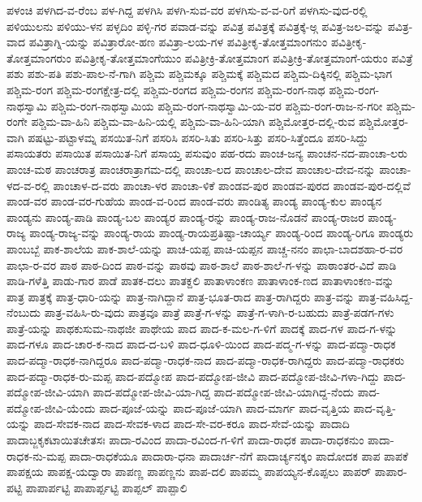 ಪಳಂಚಿ
ಪಳಗಿದ-ವ-ರೆಂಬ
ಪಳ-ಗಿದ್ದ
ಪಳಗಿಸಿ
ಪಳಗಿ-ಸುವ-ವರ
ಪಳಗಿಸು-ವ-ವ-ರಿಗೆ
ಪಳಗಿಸು-ವುದ-ರಲ್ಲಿ
ಪಳಿಯುಲನು
ಪಳಿಯು-ಳನ
ಪಳ್ಳದಿಂ
ಪಳ್ಳಿ-ಗರ
ಪವಾಡ-ವನ್ನು
ಪವಿತ್ರ
ಪವಿತ್ರಕ್ಕೆ
ಪವಿತ್ರಕ್ಕೆ-ಅ್ಗ
ಪವಿತ್ರ-ಜಲ-ವನ್ನು
ಪವಿತ್ರ-ವಾದ
ಪವಿತ್ರಾಗ್ನಿ-ಯನ್ನು
ಪವಿತ್ರಾರೋ-ಹಣ
ಪವಿತ್ರಾ-ಲಯ-ಗಳ
ಪವಿತ್ರೀಕೃ-ತೋತ್ತಮಾಂಗನುಂ
ಪವಿತ್ರೀಕೃ-ತೋತ್ತಮಾಂಗರುಂ
ಪವಿತ್ರೀಕೃ-ತೋತ್ತಮಾಂಗೆಯುಂ
ಪವಿತ್ರೀಕ್ರಿ-ತೋತ್ತಮಾಂಗ
ಪವಿತ್ರೀಕ್ರಿ-ತೋತ್ತಮಾಂಗೆ-ಯರುಂ
ಪವಿತ್ರೆ
ಪಶು
ಪಶು-ಪತಿ
ಪಶು-ಪಾಲ-ನೆ-ಗಾಗಿ
ಪಶ್ಚಿಮ
ಪಶ್ಚಿಮಕ್ಕೂ
ಪಶ್ಚಿಮಕ್ಕೆ
ಪಶ್ಚಿಮದ
ಪಶ್ಚಿಮ-ದಿಕ್ಕಿನಲ್ಲಿ
ಪಶ್ಚಿಮ-ಭಾಗ
ಪಶ್ಚಿಮ-ರಂಗ
ಪಶ್ಚಿಮ-ರಂಗಕ್ಷೇತ್ರ-ದಲ್ಲಿ
ಪಶ್ಚಿಮ-ರಂಗದ
ಪಶ್ಚಿಮ-ರಂಗನ
ಪಶ್ಚಿಮ-ರಂಗ-ನಾಥ
ಪಶ್ಚಿಮ-ರಂಗ-ನಾಥಸ್ವಾಮಿ
ಪಶ್ಚಿಮ-ರಂಗ-ನಾಥಸ್ವಾಮಿಯ
ಪಶ್ಚಿಮ-ರಂಗ-ನಾಥಸ್ವಾಮಿ-ಯ-ವರ
ಪಶ್ಚಿಮ-ರಂಗ-ರಾಜ-ನ-ಗರೀ
ಪಶ್ಚಿಮ-ರಂಗೇ
ಪಶ್ಚಿಮ-ವಾ-ಹಿನಿ
ಪಶ್ಚಿಮ-ವಾ-ಹಿನಿ-ಯಲ್ಲಿ
ಪಶ್ಚಿಮ-ವಾ-ಹಿನಿ-ಯಾಗಿ
ಪಶ್ಚಿಮೋತ್ತರ-ದಲ್ಲಿ-ರುವ
ಪಶ್ಚಿಮೋತ್ತರ-ವಾಗಿ
ಪಷಟ್ಟು-ಪಟ್ಟಾಳಮ್ನ
ಪಸಯಿತ-ನಿಗೆ
ಪಸರಿಸಿ
ಪಸರಿ-ಸಿತು
ಪಸರಿ-ಸಿತ್ತು
ಪಸರಿ-ಸಿತ್ತೆಂದೂ
ಪಸರಿ-ಸಿದ್ದು
ಪಸಾಯತರು
ಪಸಾಯಿತ
ಪಸಾಯಿತ-ನಿಗೆ
ಪಸಾಯ್ತ
ಪಸುವುಂ
ಪಹ-ರದು
ಪಾಂಚ-ಜನ್ಯ
ಪಾಂಚನ-ನದ-ಪಾಂಚಾ-ಲರು
ಪಾಂಚ-ಮಠ
ಪಾಂಚರಾತ್ರ
ಪಾಂಚರಾತ್ರಾಗಮ-ದಲ್ಲಿ
ಪಾಂಚಾ-ಲದ
ಪಾಂಚಾಲ-ದೇವ
ಪಾಂಚಾಲ-ದೇವ-ನನ್ನು
ಪಾಂಚಾ-ಳದ-ವ-ರಲ್ಲಿ
ಪಾಂಚಾಳ-ದ-ವರು
ಪಾಂಚಾ-ಳರ
ಪಾಂಚಾ-ಳಿಕೆ
ಪಾಂಡವ-ಪುರ
ಪಾಂಡವ-ಪುರದ
ಪಾಂಡವ-ಪುರ-ದಲ್ಲಿವೆ
ಪಾಂಡ-ವರ
ಪಾಂಡ-ವರ-ಗುಹೆಯ
ಪಾಂಡ-ವ-ರಿಂದ
ಪಾಂಡ-ವರು
ಪಾಂಡಿತ್ಯ
ಪಾಂಡ್ಯ
ಪಾಂಡ್ಯ-ಕುಲ
ಪಾಂಡ್ಯನ
ಪಾಂಡ್ಯನು
ಪಾಂಡ್ಯ-ಪಾಡಿ
ಪಾಂಡ್ಯ-ಬಲ
ಪಾಂಡ್ಯರ
ಪಾಂಡ್ಯ-ರನ್ನು
ಪಾಂಡ್ಯ-ರಾಜ-ನೊಡನೆ
ಪಾಂಡ್ಯ-ರಾಜರ
ಪಾಂಡ್ಯ-ರಾಜ್ಯ
ಪಾಂಡ್ಯ-ರಾಜ್ಯ-ವನ್ನು
ಪಾಂಡ್ಯ-ರಾಯ
ಪಾಂಡ್ಯ-ರಾಯಪ್ರತಿಷ್ಟಾ-ಚಾರ್ಯ್ಯ
ಪಾಂಡ್ಯ-ರಿಂದ
ಪಾಂಡ್ಯ-ರಿಗೂ
ಪಾಂಡ್ಯರು
ಪಾಂಬಬ್ಬೆ
ಪಾಕ-ಶಾಲೆಯ
ಪಾಕ-ಶಾಲೆ-ಯನ್ನು
ಪಾಚ-ಯಪ್ಪ
ಪಾಚಿ-ಯಪ್ಪನ
ಪಾಚ್ಚ-ನನಂ
ಪಾಛಾ-ಬಾದಶಹಾ-ರ-ವರ
ಪಾಛಾ-ರ-ವರ
ಪಾಠ
ಪಾಠ-ದಿಂದ
ಪಾಠ-ವನ್ನು
ಪಾಠವು
ಪಾಠ-ಶಾಲೆ
ಪಾಠ-ಶಾಲೆ-ಗ-ಳನ್ನು
ಪಾಠಾಂತರ-ವಿದೆ
ಪಾಡಿ
ಪಾಡಿ-ಗಳೆತ್ತಿ
ಪಾಡು-ಗಾರ
ಪಾಡೆ
ಪಾತಕ-ದಲು
ಪಾತಕ್ದಲಿ
ಪಾತಾಳಾಂಕಣ
ಪಾತಾಳಾಂಕ-ಣದ
ಪಾತಾಳಾಂಕಣ-ವನ್ನು
ಪಾತ್ರ
ಪಾತ್ರಕ್ಕೆ
ಪಾತ್ರ-ಧಾರಿ-ಯನ್ನು
ಪಾತ್ರ-ನಾಗಿದ್ದಾನೆ
ಪಾತ್ರ-ಭೂತ-ರಾದ
ಪಾತ್ರ-ರಾಗಿದ್ದರು
ಪಾತ್ರ-ವನ್ನು
ಪಾತ್ರ-ವಹಿಸಿದ್ದ-ನೆಂಬುದು
ಪಾತ್ರ-ವಹಿಸಿ-ರು-ವುದು
ಪಾತ್ರವೂ
ಪಾತ್ರೆ
ಪಾತ್ರೆ-ಗ-ಳನ್ನು
ಪಾತ್ರೆ-ಗ-ಳಾಗಿ-ರ-ಬಹುದು
ಪಾತ್ರೆ-ಪಡಗ-ಗಳು
ಪಾತ್ರೆ-ಯನ್ನು
ಪಾಥಕುಸುಮ-ನಾಥಜೀ
ಪಾಥೇಯ
ಪಾದ
ಪಾದ-ಕ-ಮಲ-ಗ-ಳಿಗೆ
ಪಾದಕ್ಕೆ
ಪಾದ-ಗಳ
ಪಾದ-ಗ-ಳನ್ನು
ಪಾದ-ಗಳೂ
ಪಾದ-ಚಾರ-ಕ-ನಾದ
ಪಾದ-ದ-ಬಳಿ
ಪಾದ-ಧೂಳಿ-ಯಿಂದ
ಪಾದ-ಪದ್ಮ-ಗ-ಳನ್ನು
ಪಾದ-ಪದ್ಮಾ-ರಾಧಕ
ಪಾದ-ಪದ್ಮಾ-ರಾಧಕ-ನಾಗಿದ್ದರೂ
ಪಾದ-ಪದ್ಮಾ-ರಾಧಕ-ನಾದ
ಪಾದ-ಪದ್ಮಾ-ರಾಧಕ-ರಾಗಿದ್ದರು
ಪಾದ-ಪದ್ಮಾ-ರಾಧಕರು
ಪಾದ-ಪದ್ಮಾ-ರಾಧಕ-ರು-ಮಪ್ಪ
ಪಾದ-ಪದ್ಮೋಪ
ಪಾದ-ಪದ್ಮೋಪ-ಜೀವಿ
ಪಾದ-ಪದ್ಮೋಪ-ಜೀವಿ-ಗಳಾ-ಗಿದ್ದು
ಪಾದ-ಪದ್ಮೋಪ-ಜೀವಿ-ಯಾಗಿ
ಪಾದ-ಪದ್ಮೋಪ-ಜೀವಿ-ಯಾ-ಗಿದ್ದ
ಪಾದ-ಪದ್ಮೋಪ-ಜೀವಿ-ಯಾಗಿದ್ದ-ನೆಂದು
ಪಾದ-ಪದ್ಮೋಪ-ಜೀವಿ-ಯೆಂದು
ಪಾದ-ಪೂಜೆ-ಯನ್ನು
ಪಾದ-ಪೂಜೆ-ಯಾಗಿ
ಪಾದ-ಮಾರ್ಗ
ಪಾದ-ವೃತ್ತಿಯ
ಪಾದ-ವೃತ್ತಿ-ಯನ್ನು
ಪಾದ-ಸೇವಕ-ನಾದ
ಪಾದ-ಸೇವಕ-ಳಾದ
ಪಾದ-ಸೇ-ವರ-ಕರೂ
ಪಾದ-ಸೇವೆ-ಯನ್ನು
ಪಾದಾದಿ
ಪಾದಾಬ್ಜಕೃಕಟಾಯಿತಚೇತಸಃ
ಪಾದಾ-ರವಿಂದ
ಪಾದಾ-ರವಿಂದ-ಗ-ಳಿಗೆ
ಪಾದಾ-ರಾಧಕ
ಪಾದಾ-ರಾಧಕನುಂ
ಪಾದಾ-ರಾಧಕ-ನು-ಮಪ್ಪ
ಪಾದಾ-ರಾಧಕೆಯೂ
ಪಾದಾರಾ-ಧನಾ
ಪಾದಾರ್ಚ-ನೆಗೆ
ಪಾದಾರ್ಚ್ಯನಕ್ಕಂ
ಪಾದೋದಕ
ಪಾಪ
ಪಾಪಕೆ
ಪಾಪಕ್ಷಯ
ಪಾಪಕ್ಷ-ಯದ್ವಾರಾ
ಪಾಪಣ್ಣ
ಪಾಪಣ್ಣನು
ಪಾಪ-ದಲಿ
ಪಾಪಮ್ಮ
ಪಾಪಯ್ಯನ-ಕೊಪ್ಪಲು
ಪಾಪರ್
ಪಾಪಾರ-ಪಟ್ಟಿ
ಪಾಪಾರ್ಪಟ್ಟಿ
ಪಾಪಾರ್ಪ್ಪಟ್ಟಿ
ಪಾಪ್ಪಲ್
ಪಾಪ್ಪಾಲಿ
